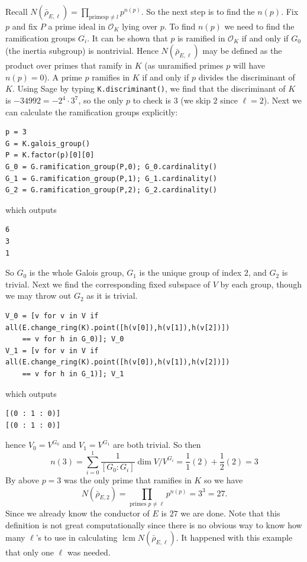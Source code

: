 \documentclass{book}
\begin{document}
Recall $N(\bar{\rho}_{E,\ell}) = \prod_{\text{primes
$p\neq l$}} p ^{n(p)}$. So the next step is to find the
$n(p)$. Fix $p$ and fix $P$ a prime ideal in
$\mathcal{O}_K$ lying over $p$. To find $n(p)$ we need to
find the ramification groups $G_i$. It can be shown that
$p$ is ramified in $\mathcal{O}_K$ if and only if $G_0$
(the inertia subgroup) is nontrivial.
Hence $N(\bar{\rho}_{E,\ell})$ may be defined as the
product over primes that ramify in $K$ (as unramified
primes $p$ will have $n(p)=0$). A prime $p$ ramifies in
$K$ if and only if $p$ divides the discriminant of $K$.
Using Sage by typing \verb|K.discriminant()|, we find
that the discriminant of $K$ is
$-34992 = -2^4\cdot 3^7$, so the only $p$ to check is $3$ (we
skip $2$ since $\ell=2$). Next we can calculate the
ramification groups explicitly:
\begin{lstlisting}
p = 3
G = K.galois_group()
P = K.factor(p)[0][0]
G_0 = G.ramification_group(P,0); G_0.cardinality()
G_1 = G.ramification_group(P,1); G_1.cardinality()
G_2 = G.ramification_group(P,2); G_2.cardinality()
\end{lstlisting}
which outputs
\begin{lstlisting}
6
3
1
\end{lstlisting}
So $G_0$ is the whole Galois group, $G_1$ is the unique group of index $2$, and $G_2$ is trivial. Next we find the corresponding fixed subspace of $V$ by each group, though we may throw out $G_2$ as it is trivial.
\begin{lstlisting}
V_0 = [v for v in V if all(E.change_ring(K).point([h(v[0]),h(v[1]),h(v[2])])
    == v for h in G_0)]; V_0
V_1 = [v for v in V if all(E.change_ring(K).point([h(v[0]),h(v[1]),h(v[2])])
    == v for h in G_1)]; V_1
\end{lstlisting}
which outputs
\begin{lstlisting}
[(0 : 1 : 0)]
[(0 : 1 : 0)]
\end{lstlisting}
hence $V_0 = V^{G_0}$ and $V_1 = V^{G_1}$ are both
trivial. So then
$$
    n(3) = \sum_{i=0}^1\frac{1}{[G_0\colon G_i]}\dim
    V/V^{G_i} = \frac{1}{1}(2) + \frac{1}{2}(2) = 3
$$
By above $p=3$ was the only prime that ramifies in $K$ so we have
$$
    N(\bar{\rho}_{E,2}) = \prod_{\text{primes $p\neq
    \ell$}}p^{n(p)} = 3^3 = 27.
$$
Since we already know the conductor of $E$ is $27$ we are
done. Note that this definition is not great
computationally since there is no obvious way to know how
many $\ell$'s to use in calculating $\operatorname{lcm}
N(\bar{\rho}_{E,\ell})$. It happened with this example
that only one $\ell$ was needed.
\end{document}
